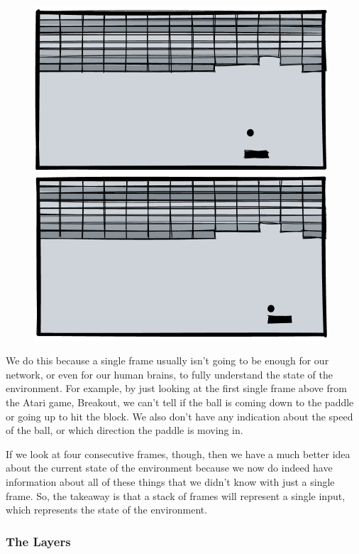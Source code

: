 \begin{figure}[h]
\centering
\begin{minipage}{0.49\linewidth}
  \centering
  \includegraphics[width=0.618\linewidth]{pix/q_learning/game_3.png}
\end{minipage}%
\begin{minipage}{0.49\linewidth}
  \centering
  \includegraphics[width=0.618\linewidth]{pix/q_learning/game_4.png}
\end{minipage}
\end{figure}

We do this because a single frame usually isn't going to be enough for our network, 
or even for our human brains, to fully understand the state of the environment. For 
example, by just looking at the first single frame above from the Atari game, 
Breakout, we can't tell if the ball is coming down to the paddle or going up to hit 
the block. We also don't have any indication about the speed of the ball, or which 
direction the paddle is moving in.

If we look at four consecutive frames, though, then we have a much better idea about 
the current state of the environment because we now do indeed have information about 
all of these things that we didn't know with just a single frame. So, the takeaway 
is that a stack of frames will represent a single input, which represents the state 
of the environment.


\subsubsection{The Layers}


